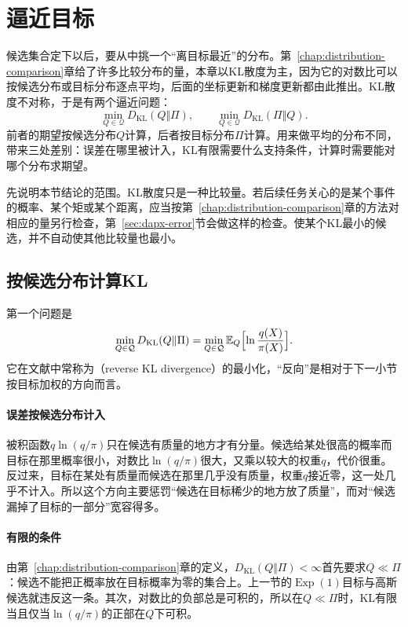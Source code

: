 \section{逼近目标}
\label{sec:dapx-objectives}

候选集合定下以后，要从中挑一个“离目标最近”的分布。第~\ref{chap:distribution-comparison}章给了许多比较分布的量，本章以KL散度为主，因为它的对数比可以按候选分布或目标分布逐点平均，后面的坐标更新和梯度更新都由此推出。KL散度不对称，于是有两个逼近问题：
\begin{equation}
 \min_{Q\in\mathcal{Q}}D_{\mathrm{KL}}(Q\Vert\Pi),\qquad \min_{Q\in\mathcal{Q}}D_{\mathrm{KL}}(\Pi\Vert Q) .
 \label{eq:dapx-two-problems}
\end{equation}
前者的期望按候选分布$Q$计算，后者按目标分布$\Pi$计算。用来做平均的分布不同，带来三处差别：误差在哪里被计入，KL有限需要什么支持条件，计算时需要能对哪个分布求期望。

先说明本节结论的范围。KL散度只是一种比较量。若后续任务关心的是某个事件的概率、某个矩或某个距离，应当按第~\ref{chap:distribution-comparison}章的方法对相应的量另行检查，第~\ref{sec:dapx-error}节会做这样的检查。使某个KL最小的候选，并不自动使其他比较量也最小。

\subsection{按候选分布计算KL}
\label{sec:dapx-reverse-kl}

第一个问题是
\begin{equation}
 \min_{Q\in\mathcal{Q}}D_{\mathrm{KL}}(Q\Vert\Pi)=\min_{Q\in\mathcal{Q}}\mathbb{E}_{Q}\Bigl[\ln\frac{q(X)}{\pi(X)}\Bigr] .
 \label{eq:dapx-reverse-problem}
\end{equation}
它在文献中常称为（reverse KL divergence）的最小化，“反向”是相对于下一小节按目标加权的方向而言。

\paragraph{误差按候选分布计入}
被积函数$q\ln(q/\pi)$只在候选有质量的地方才有分量。候选给某处很高的概率而目标在那里概率很小，对数比$\ln(q/\pi)$很大，又乘以较大的权重$q$，代价很重。反过来，目标在某处有质量而候选在那里几乎没有质量，权重$q$接近零，这一处几乎不计入。所以这个方向主要惩罚“候选在目标稀少的地方放了质量”，而对“候选漏掉了目标的一部分”宽容得多。

\paragraph{有限的条件}
由第~\ref{chap:distribution-comparison}章的定义，$D_{\mathrm{KL}}(Q\Vert\Pi)<\infty$首先要求$Q\ll\Pi$：候选不能把正概率放在目标概率为零的集合上。上一节的$\operatorname{Exp}(1)$目标与高斯候选就违反这一条。其次，对数比的负部总是可积的，所以在$Q\ll\Pi$时，KL有限当且仅当$\ln(q/\pi)$的正部在$Q$下可积。

